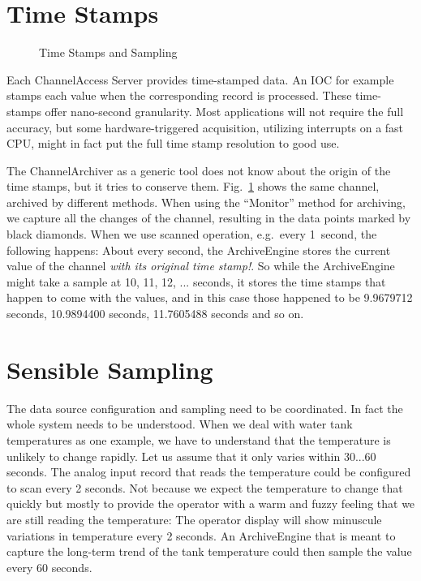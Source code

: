 \section{Time Stamps}
\begin{figure}[htb]
\begin{center}
\end{center}
\caption{\label{fig:times}Time Stamps and Sampling}
\end{figure}

Each ChannelAccess Server provides time-stamped data. An IOC for
example stamps each value when the corresponding record is
processed.  These time-stamps offer nano-second granularity. Most
applications will not require the full accuracy, but some
hardware-triggered acquisition, utilizing interrupts on a fast CPU,
might in fact put the full time stamp resolution to good use.

The ChannelArchiver as a generic tool does not know about the origin
of the time stamps, but it tries to conserve them.
Fig.~\ref{fig:times} shows the same channel, archived by different methods.
When using the ``Monitor'' method for archiving, we capture all the
changes of the channel, resulting in the data points marked by black
diamonds.
When we use scanned operation, e.g.\ every 1~second, the following
happens: About every second, the ArchiveEngine stores the current
value of the channel \emph{with its original time stamp!}.
So while the ArchiveEngine might take a sample at 10, 11, 12,
... seconds, it stores the time stamps that happen to come with the
values, and in this case those happened to be
9.9679712 seconds, 10.9894400 seconds, 11.7605488 seconds and so on.

\section{Sensible Sampling}
The data source configuration and sampling need to be coordinated.  In
fact the whole system needs to be understood. When we deal with water
tank temperatures as one example, we have to understand that the
temperature is unlikely to change rapidly. Let us assume that it only
varies within 30...60 seconds. The analog input record that reads the
temperature could be configured to scan every 2 seconds. Not because
we expect the temperature to change that quickly but mostly to provide
the operator with a warm and fuzzy feeling that we are still reading
the temperature: The operator display will show minuscule variations
in temperature every 2 seconds.  An ArchiveEngine that is meant to
capture the long-term trend of the tank temperature could then sample
the value every 60 seconds.

